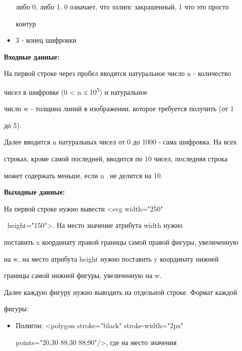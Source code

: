 \begin{question}
\begin{itemize}
  либо 0, либо 1. 0 означает, что эллипс закрашенный, 1 что это просто

  контур

\item

  3 - конец шифровки

\end{itemize}



\textbf{Входные данные:}



На первой строке через пробел вводятся натуральное число n - количество

чисел в шифровке (0 \textless{} n ≤ 10\textsuperscript{5}) и натуральное

число w - толщина линий в изображении, которое требуется получить (от 1

до 5).



Далее вводится n натуральных чисел от 0 до 1000 - сама шифровка. На всех

строках, кроме самой последней, вводится по 10 чисел, последняя строка

может содержать меньше, если n~ не делится на 10.



\textbf{Выходные данные:}



На первой строке нужно вывести \textless svg width="250"

~height="150"\textgreater. На место значение атрибута width нужно

поставить x координату правой границы самой правой фигуры, увеличенную

на w, на место атрибута height нужно поставить y координату нижней

границы самой нижней фигуры, увеличенную на w.



Далее каждую фигуру нужно выводить на отдельной строке. Формат каждой

фигуры:



\begin{itemize}

\tightlist

\item

  Полигон: \textless polygon stroke="black" stroke-width="2px"

  points="20,30 88,30 88,90"/\textgreater, где на место значения


\end{itemize}
\end{question}
